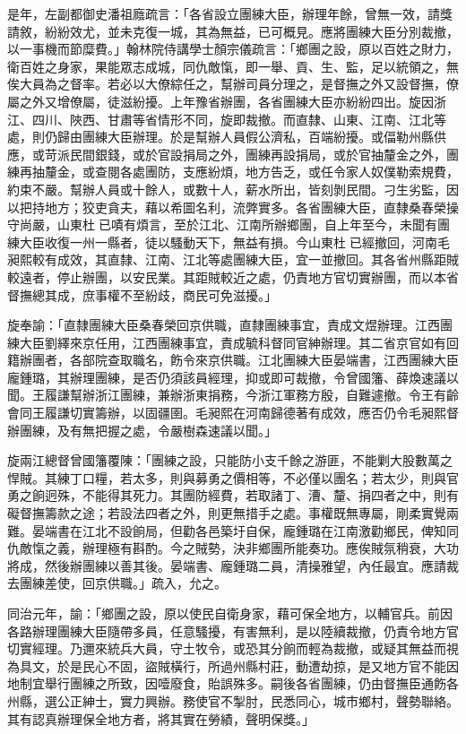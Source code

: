 \begin{pinyinscope}
是年，左副都御史潘祖廕疏言：「各省設立團練大臣，辦理年餘，曾無一效，請獎請敘，紛紛效尤，並未克復一城，其為無益，已可概見。應將團練大臣分別裁撤，以一事機而節糜費。」翰林院侍講學士顏宗儀疏言：「鄉團之設，原以百姓之財力，衛百姓之身家，果能眾志成城，同仇敵愾，即一舉、貢、生、監，足以統領之，無俟大員為之督率。若必以大僚綜任之，幫辦司員分理之，是督撫之外又設督撫，僚屬之外又增僚屬，徒滋紛擾。上年豫省辦團，各省團練大臣亦紛紛四出。旋因浙江、四川、陜西、甘肅等省情形不同，旋即裁撤。而直隸、山東、江南、江北等處，則仍歸由團練大臣辦理。於是幫辦人員假公濟私，百端紛擾。或偪勒州縣供應，或苛派民間銀錢，或於官設捐局之外，團練再設捐局，或於官抽釐金之外，團練再抽釐金，或查閱各處團防，支應紛煩，地方告乏，或任令家人奴僕勒索規費，約束不嚴。幫辦人員或十餘人，或數十人，薪水所出，皆刻剝民間。刁生劣監，因以把持地方；狡吏貪夫，藉以希圖名利，流弊實多。各省團練大臣，直隸桑春榮操守尚嚴，山東杜已嘖有煩言，至於江北、江南所辦鄉團，自上年至今，未聞有團練大臣收復一州一縣者，徒以騷動天下，無益有損。今山東杜已經撤回，河南毛昶熙較有成效，其直隸、江南、江北等處團練大臣，宜一並撤回。其各省州縣距賊較遠者，停止辦團，以安民業。其距賊較近之處，仍責地方官切實辦團，而以本省督撫總其成，庶事權不至紛歧，商民可免滋擾。」

旋奉諭：「直隸團練大臣桑春榮回京供職，直隸團練事宜，責成文煜辦理。江西團練大臣劉繹來京任用，江西團練事宜，責成毓科督同官紳辦理。其二省京官如有回籍辦團者，各部院查取職名，飭令來京供職。江北團練大臣晏端書，江西團練大臣龐鍾璐，其辦理團練，是否仍須該員經理，抑或即可裁撤，令曾國籓、薛煥速議以聞。王履謙幫辦浙江團練，兼辦浙東捐務，今浙江軍務方殷，自難遽撤。令王有齡會同王履謙切實籌辦，以固疆圉。毛昶熙在河南歸德著有成效，應否仍令毛昶熙督辦團練，及有無把握之處，令嚴樹森速議以聞。」

旋兩江總督曾國籓覆陳：「團練之設，只能防小支千餘之游匪，不能剿大股數萬之悍賊。其練丁口糧，若太多，則與募勇之價相等，不必僅以團名；若太少，則與官勇之餉迥殊，不能得其死力。其團防經費，若取諸丁、漕、釐、捐四者之中，則有礙督撫籌款之途；若設法四者之外，則更無措手之處。事權既無專屬，剛柔實覺兩難。晏端書在江北不設餉局，但勸各邑築圩自保，龐鍾璐在江南激勸鄉民，俾知同仇敵愾之義，辦理極有斟酌。今之賊勢，決非鄉團所能奏功。應俟賊氛稍衰，大功將成，然後辦團練以善其後。晏端書、龐鍾璐二員，清操雅望，內任最宜。應請裁去團練差使，回京供職。」疏入，允之。

同治元年，諭：「鄉團之設，原以使民自衛身家，藉可保全地方，以輔官兵。前因各路辦理團練大臣隨帶多員，任意騷擾，有害無利，是以陸續裁撤，仍責令地方官切實經理。乃邇來統兵大員，守土牧令，或恐其分餉而輕為裁撤，或疑其無益而視為具文，於是民心不固，盜賊橫行，所過州縣村莊，動遭劫掠，是又地方官不能因地制宜舉行團練之所致，因噎廢食，貽誤殊多。嗣後各省團練，仍由督撫臣通飭各州縣，選公正紳士，實力興辦。務使官不掣肘，民悉同心，城市鄉村，聲勢聯絡。其有認真辦理保全地方者，將其實在勞績，聲明保獎。」


\end{pinyinscope}
